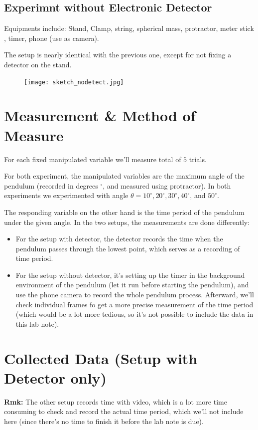 \documentclass{article}
\begin{document}
\pagebreak

\subsection{Experimnt without Electronic Detector}
Equipments include: Stand, Clamp, string, spherical mass, protractor, meter stick , timer, phone (use as camera).

The setup is nearly identical with the previous one, except for not fixing a detector on the stand.
\begin{figure}[h!]
    \centering
    \texttt{[image: sketch\_nodetect.jpg]}
\end{figure}

\section{Measurement \& Method of Measure}
For each fixed manipulated variable we'll measure total of $5$ trials.

For both experiment, the manipulated variables are the maximum angle of the pendulum (recorded in degrees $ ^\circ$, and measured using protractor). In both experiments we experimented with angle $\theta=10^\circ, 20^\circ, 30^\circ, 40^\circ$, and $50^\circ$. 

The responding variable on the other hand is the time period of the pendulum under the given angle. In the two setups, the measurements are done differently:
\begin{itemize}
    \item For the setup with detector, the detector records the time when the pendulum passes through the lowest point, which serves as a recording of time period.
    \item For the setup without detector, it's setting up the timer in the background environment of the pendulum (let it run before starting the pendulum), and use the phone camera to record the whole pendulum process. Afterward, we'll check individual frames fo get a more precise measurement of the time period (which would be a lot more tedious, so it's not possible to include the data in this lab note).
\end{itemize}

\section{Collected Data (Setup with Detector only)}
\textbf{Rmk:} The other setup records time with video, which is a lot more time consuming to check and record the actual time period, which we'll not include here (since there's no time to finish it before the lab note is due).
\end{document}
